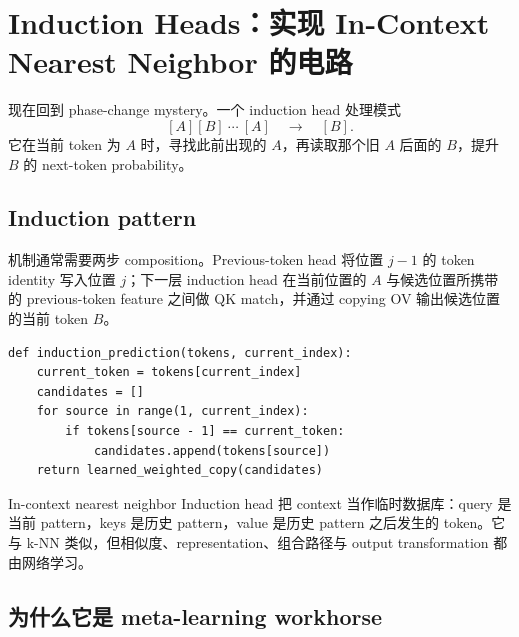 \section{Induction Heads：实现 In-Context Nearest Neighbor 的电路}

现在回到 phase-change mystery。一个 induction head 处理模式
\[
[A][B]\ \cdots\ [A]\quad\longrightarrow\quad[B].
\]
它在当前 token 为 $A$ 时，寻找此前出现的 $A$，再读取那个旧 $A$ 后面的 $B$，提升 $B$ 的 next-token probability。

\subsection{Induction pattern}

机制通常需要两步 composition。Previous-token head 将位置 $j-1$ 的 token identity 写入位置 $j$；下一层 induction head 在当前位置的 $A$ 与候选位置所携带的 previous-token feature 之间做 QK match，并通过 copying OV 输出候选位置的当前 token $B$。


\begin{lstlisting}[caption={Induction-head algorithm 的概念性伪代码。}]
def induction_prediction(tokens, current_index):
    current_token = tokens[current_index]
    candidates = []
    for source in range(1, current_index):
        if tokens[source - 1] == current_token:
            candidates.append(tokens[source])
    return learned_weighted_copy(candidates)
\end{lstlisting}

\begin{importantbox}{In-context nearest neighbor}
Induction head 把 context 当作临时数据库：query 是当前 pattern，keys 是历史 pattern，value 是历史 pattern 之后发生的 token。它与 k-NN 类似，但相似度、representation、组合路径与 output transformation 都由网络学习。
\end{importantbox}


\subsection{为什么它是 meta-learning workhorse}


